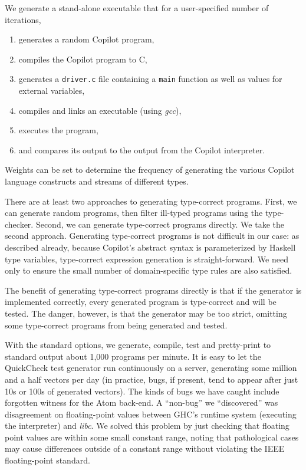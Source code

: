 \documentclass[preprint]{sigplanconf}
\begin{document}
We generate a stand-alone executable that for a user-specified number of iterations,
\begin{enumerate}
\item generates a random Copilot program,
\item compiles the Copilot program to C,
\item generates a {\tt driver.c} file containing a {\tt main} function as well
  as values for external variables,
\item compiles and links an executable (using \emph{gcc}),
\item executes the program,
\item and compares its output to the output from the Copilot interpreter.
\end{enumerate}

\noindent
Weights can be set to determine the frequency of generating the various Copilot
language constructs and streams of different types.  

There are at least two approaches to generating type-correct programs.  First,
we can generate random programs, then filter ill-typed programs using the
type-checker.  Second, we can generate type-correct programs directly.  We take
the second approach.  Generating type-correct programs is not difficult in our
case: as described already, because Copilot's abstract syntax is parameterized
by Haskell type variables, type-correct expression generation is
straight-forward.  We need only to ensure the small number of domain-specific
type rules are also satisfied.

The benefit of generating type-correct programs directly is that if the
generator is implemented correctly, every generated program is type-correct and
will be tested.  The danger, however, is that the generator may be too strict,
omitting some type-correct programs from being generated and tested.


With the standard options, we generate, compile, test and pretty-print to
standard output about 1,000 programs per minute.  It is easy to let the
QuickCheck test generator run continuously on a server, generating some million
and a half vectors per day (in practice, bugs, if present, tend to appear after
just 10s or 100s of generated vectors).  The kinds of bugs we have caught
include forgotten witness for the Atom back-end.  A ``non-bug'' we
``discovered'' was disagreement on floating-point values between GHC's runtime
system (executing the interpreter) and \emph{libc}.  We solved this problem by
just checking that floating point values are within some small constant range,
noting that pathological cases may cause differences outside of a constant range
without violating the IEEE floating-point standard.
\end{document}
